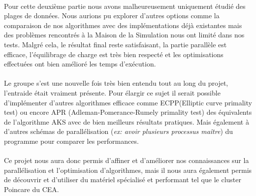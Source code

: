 	\paragraph{}Pour cette deuxième partie nous avons malheureusement uniquement étudié des plages de données. Nous aurions pu explorer d'autres options comme la comparaison de nos algorithmes avec des implémentations déjà existantes mais des problèmes rencontrés à la Maison de la Simulation nous ont limité dans nos tests. Malgré cela, le résultat final reste satisfaisant, la partie parallèle est efficace, l'équilibrage de charge est très bien respecté et les optimisations effectuées ont bien amélioré les temps d’exécution.
	
	\paragraph{}Le groupe s'est une nouvelle fois très bien entendu tout au long du projet, l'entraide était vraiment présente. Pour élargir ce sujet il serait possible d’implémenter d'autres algorithmes efficace comme ECPP(Elliptic curve primality test) ou encore APR (Adleman-Pomerance-Rumely primality test) des équivalents de l'algorithme AKS avec de bien meilleurs résultats pratiques. Mais également à d'autres schémas de parallélisation (\textit{ex: avoir plusieurs processus maître}) du programme pour comparer les performances.
	
	\paragraph{}Ce projet nous aura donc permis d'affiner et d'améliorer nos connaissances sur la parallélisation et l'optimisation d'algorithmes, mais il nous aura également permis de découvrir et d'utiliser du matériel spécialisé et performant tel que le cluster Poincare du CEA. 




